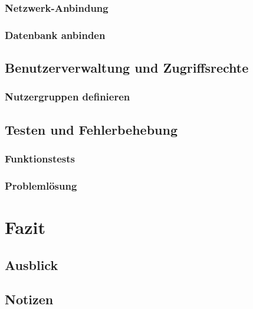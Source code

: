 \documentclass[12pt,a4paper]{report}
\begin{document}
  \subsection{Netzwerk-Anbindung}  
  \subsection{Datenbank anbinden}
\section{Benutzerverwaltung und Zugriffsrechte}
  \subsection{Nutzergruppen definieren}
\section{Testen und Fehlerbehebung}
  \subsection{Funktionstests}
  \subsection{Problemlösung}   


\chapter*{Fazit}
\setcounter{section}{0}

\section{Ausblick}

\section{Notizen}
\end{document}
